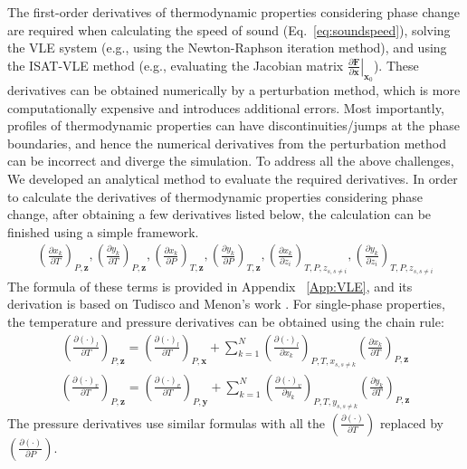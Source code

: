 The first-order derivatives of thermodynamic properties considering phase change are required when calculating the speed of sound (Eq.~\ref{eq:soundspeed}), solving the VLE system (e.g., using the Newton-Raphson iteration method), and using the ISAT-VLE method (e.g., evaluating the Jacobian matrix $\left.\frac{\partial  \mathbf{F}}{\partial \mathbf{x}}\right|_{\mathbf{x}_0}$). These derivatives can be obtained numerically by a perturbation method, which is more computationally expensive and introduces additional errors. Most importantly, profiles of thermodynamic properties can have discontinuities/jumps at the phase boundaries, and hence the numerical derivatives from the perturbation method can be incorrect and diverge the simulation. To address all the above challenges, We developed an analytical method to evaluate the required derivatives.
In order to calculate the derivatives of thermodynamic properties considering phase change, after obtaining a few derivatives listed below, the calculation can be finished using a simple framework.
\begin{align}
\left(\frac{\partial x_k}{\partial T}\right)_{P,\mathbf{z}},\left(\frac{\partial y_k}{\partial T}\right)_{P,\mathbf{z}},\left(\frac{\partial x_k}{\partial P}\right)_{T,\mathbf{z}},\left(\frac{\partial y_k}{\partial P}\right)_{T,\mathbf{z}},\left(\frac{\partial x_k}{\partial z_i}\right)_{T,P,z_{s,s\neq i}},\left(\frac{\partial y_k}{\partial z_i}\right)_{T,P,z_{s,s\neq i}}
\end{align}
The formula of these terms is provided in Appendix ~\ref{App:VLE}, and its derivation is based on Tudisco and Menon's work \cite{tudisco2020analytical}.
For single-phase properties, the temperature and pressure derivatives can be obtained using the chain rule:
\begin{align}
\left(\frac{\partial (\cdot)_l}{\partial T}\right)_{P,\mathbf{z}} = \left(\frac{\partial (\cdot)_l}{\partial T}\right)_{P,\mathbf{x}} + \sum_{k=1}^N\left(\frac{\partial (\cdot)_l}{\partial x_k}\right)_{P,T,x_{s,s\neq k}}\left(\frac{\partial x_k}{\partial T}\right)_{P,\mathbf{z}} \label{eq:dvdT}
\end{align}
\begin{align}
\left(\frac{\partial (\cdot)_v}{\partial T}\right)_{P,\mathbf{z}} = \left(\frac{\partial (\cdot)_v}{\partial T}\right)_{P,\mathbf{y}} + \sum_{k=1}^N\left(\frac{\partial (\cdot)_v}{\partial y_k}\right)_{P,T,y_{s,s\neq k}}\left(\frac{\partial y_k}{\partial T}\right)_{P,\mathbf{z}} \label{eq:dldT}
\end{align}
The pressure derivatives use similar formulas with all the $\left(\frac{\partial (\cdot)}{\partial T }\right)$ replaced by $\left(\frac{\partial (\cdot)}{\partial P }\right)$.

